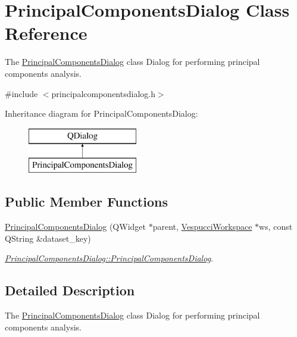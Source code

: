 \hypertarget{class_principal_components_dialog}{}\section{Principal\+Components\+Dialog Class Reference}
\label{class_principal_components_dialog}


The \hyperlink{class_principal_components_dialog}{Principal\+Components\+Dialog} class Dialog for performing principal components analysis.  




{\ttfamily \#include $<$principalcomponentsdialog.\+h$>$}

Inheritance diagram for Principal\+Components\+Dialog\+:\begin{figure}[H]
\begin{center}
\leavevmode
\includegraphics[height=2.000000cm]{class_principal_components_dialog}
\end{center}
\end{figure}
\subsection*{Public Member Functions}
\begin{DoxyCompactItemize}
\item 
\hyperlink{class_principal_components_dialog_a40eb2bedebda7fcbc017badde60931e6}{Principal\+Components\+Dialog} (Q\+Widget $\ast$parent, \hyperlink{class_vespucci_workspace}{Vespucci\+Workspace} $\ast$ws, const Q\+String \&dataset\+\_\+key)
\begin{DoxyCompactList}\small\item\em \hyperlink{class_principal_components_dialog_a40eb2bedebda7fcbc017badde60931e6}{Principal\+Components\+Dialog\+::\+Principal\+Components\+Dialog}. \end{DoxyCompactList}\end{DoxyCompactItemize}


\subsection{Detailed Description}
The \hyperlink{class_principal_components_dialog}{Principal\+Components\+Dialog} class Dialog for performing principal components analysis. 

